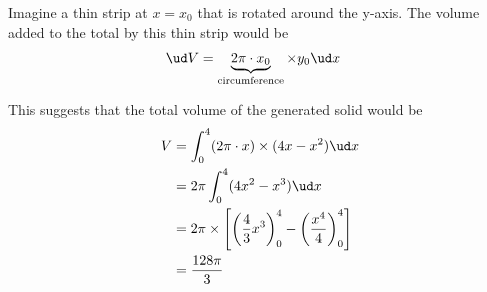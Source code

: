 \begin{solution}[\halfpage]
   Imagine a thin strip at $x = x_0$ that is rotated around the y-axis. The volume 
   added to the total by this thin strip would be 
   \begin{align}
     \ud V &= \underbrace{2\pi\cdot x_0}_{\text{circumference}}\times y_0\ud x
   \end{align}
   
   This suggests that the total volume of the generated solid would be
   \begin{align}
   	 V &= \int_0^{\vbone} (2\pi\cdot x)\times(\vbone x-x^2)\ud x \\
   	   &= 2\pi\int_0^{\vbone} (\vbone x^2-x^3)\ud x \\
   	   &= 2\pi\times\left[ \left( \vbtwo x^3\right)_0^{\vbone} - \left( \dfrac{x^4}{4}\right)_0^{\vbone}\right] \\
   	   &= \vbthree
   \end{align}
\end{solution}
